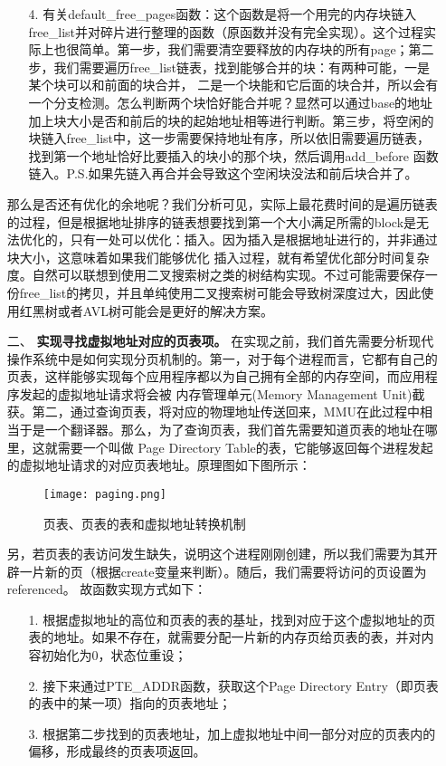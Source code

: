 \documentclass[UTF8, a4paper]{ctexart}
\begin{document}
\begin{enumerate}
\begin{enumerate}
        \item [4.] 有关default\_free\_pages函数：这个函数是将一个用完的内存块链入free\_list并对碎片进行整理的函数（原函数并没有完全实现）。这个过程实际上也很简单。第一步，我们需要清空要释放的内存块的所有page；第二步，我们需要遍历free\_list链表，找到能够合并的块：有两种可能，一是某个块可以和前面的块合并，
                   二是一个块能和它后面的块合并，所以会有一个分支检测。怎么判断两个块恰好能合并呢？显然可以通过base的地址加上块大小是否和前后的块的起始地址相等进行判断。第三步，将空闲的块链入free\_list中，这一步需要保持地址有序，所以依旧需要遍历链表，找到第一个地址恰好比要插入的块小的那个块，然后调用add\_before
                   函数链入。P.S.如果先链入再合并会导致这个空闲块没法和前后块合并了。
    \end{enumerate}
    那么是否还有优化的余地呢？我们分析可见，实际上最花费时间的是遍历链表的过程，但是根据地址排序的链表想要找到第一个大小满足所需的block是无法优化的，只有一处可以优化：插入。因为插入是根据地址进行的，并非通过块大小，这意味着如果我们能够优化
    插入过程，就有希望优化部分时间复杂度。自然可以联想到使用二叉搜索树之类的树结构实现。不过可能需要保存一份free\_list的拷贝，并且单纯使用二叉搜索树可能会导致树深度过大，因此使用红黑树或者AVL树可能会是更好的解决方案。

    \item [二、] \textbf{实现寻找虚拟地址对应的页表项。}
    在实现之前，我们首先需要分析现代操作系统中是如何实现分页机制的。第一，对于每个进程而言，它都有自己的页表，这样能够实现每个应用程序都以为自己拥有全部的内存空间，而应用程序发起的虚拟地址请求将会被
    内存管理单元(Memory Management Unit)截获。第二，通过查询页表，将对应的物理地址传送回来，MMU在此过程中相当于是一个翻译器。那么，为了查询页表，我们首先需要知道页表的地址在哪里，这就需要一个叫做
    Page Directory Table的表，它能够返回每个进程发起的虚拟地址请求的对应页表地址。原理图如下图所示：
    \begin{figure}[!htb]
        \centering
        \texttt{[image: paging.png]}
        \label{fig:1}
        \caption{页表、页表的表和虚拟地址转换机制}
    \end{figure}
    \par
    另，若页表的表访问发生缺失，说明这个进程刚刚创建，所以我们需要为其开辟一片新的页（根据create变量来判断）。随后，我们需要将访问的页设置为referenced。
    故函数实现方式如下：
    \begin{enumerate}
        \item [1.] 根据虚拟地址的高位和页表的表的基址，找到对应于这个虚拟地址的页表的地址。如果不存在，就需要分配一片新的内存页给页表的表，并对内容初始化为0，状态位重设；
        \item [2.] 接下来通过PTE\_ADDR函数，获取这个Page Directory Entry（即页表的表中的某一项）指向的页表地址；
        \item [3.] 根据第二步找到的页表地址，加上虚拟地址中间一部分对应的页表内的偏移，形成最终的页表项返回。
    \end{enumerate}
    \end{enumerate}
\end{document}
